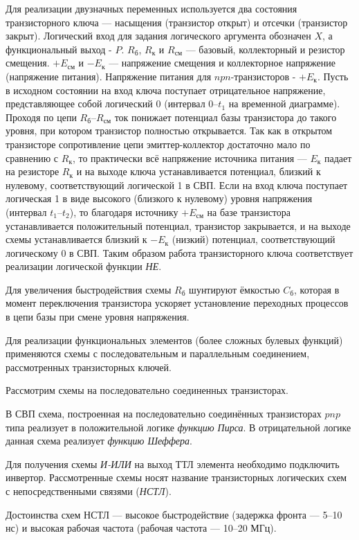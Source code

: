 \documentclass[10pt,a4paper,titlepage]{article}
\begin{document}
Для реализации двузначных переменных используется два состояния транзисторного ключа --- насыщения (транзистор открыт) и отсечки (транзистор закрыт).
Логический вход для задания логического аргумента обозначен $X$, а функциональный выход - $P$. $R_{б}$, $R_{к}$ и $R_{см}$ --- базовый, коллекторный и резистор смещения.
$+E_{см}$ и $-E_{к}$ --- напряжение смещения и коллекторное напряжение (напряжение питания).
Напряжение питания для $npn$-транзисторов - $+E_{к}$.
Пусть в исходном состоянии на вход ключа поступает отрицательное напряжение, представляющее собой логический 0 (интервал 0--$t_1$ на временной диаграмме).
Проходя по цепи $R_{б}$--$R_{см}$ ток понижает потенциал базы транзистора до такого уровня, при котором транзистор полностью открывается.
Так как в открытом транзисторе сопротивление цепи эмиттер-коллектор достаточно мало по сравнению с $R_{к}$, то практически всё напряжение источника питания --- $E_{к}$ падает на резисторе $R_{к}$ и на выходе ключа устанавливается потенциал, близкий к нулевому, соответствующий логической 1 в СВП.
Если на вход ключа поступает логическая 1 в виде высокого (близкого к нулевому) уровня напряжения (интервал $t_1$--$t_2$), то благодаря источнику $+E_{см}$ на базе транзистора устанавливается положительный потенциал, транзистор закрывается, и на выходе схемы устанавливается близкий к $-E_{к}$ (низкий) потенциал, соответствующий логическому 0 в СВП.
Таким образом работа транзисторного ключа соответствует реализации логической функции \textit{НЕ}.

Для увеличения быстродействия схемы $R_{б}$ шунтируют ёмкостью $C_{б}$, которая в момент переключения транзистора ускоряет установление переходных процессов в цепи базы при смене уровня напряжения.

Для реализации функциональных элементов (более сложных булевых функций) применяются схемы с последовательным и параллельным соединением, рассмотренных транзисторных ключей.

Рассмотрим схемы на последовательно соединенных транзисторах.

В СВП схема, построенная на последовательно соединённых транзисторах $pnp$ типа реализует в положительной логике \textit{функцию Пирса}.
В отрицательной логике данная схема реализует \textit{функцию Шеффера}.

Для получения схемы \textit{И-ИЛИ} на выход ТТЛ элемента необходимо подключить инвертор.
Рассмотренные схемы носят название транзисторных логических схем с непосредственными связями (\textit{НСТЛ}).

Достоинства схем НСТЛ --- высокое быстродействие (задержка фронта --- 5--10 нс) и высокая рабочая частота (рабочая частота --- 10--20 МГц).
\end{document}
